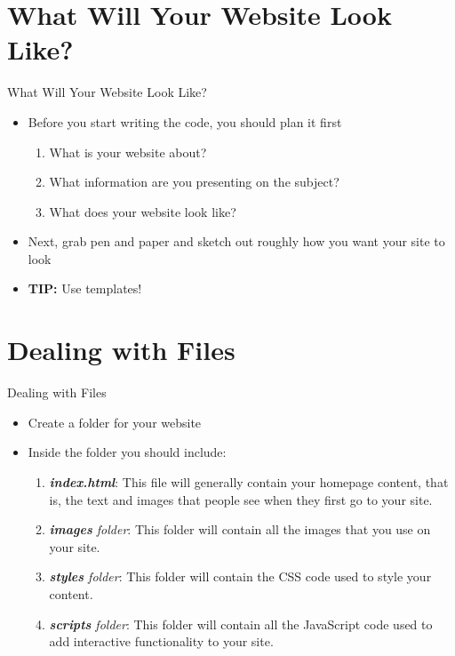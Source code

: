 \documentclass[aspectratio=169]{beamer}
\begin{document}
\begin{darkframes}
    \section{What Will Your Website Look Like?}
    \begin{frame}{What Will Your Website Look Like?}
        \begin{itemize}
            \item Before you start writing the code, you should plan it first
            \begin{enumerate}
                \item What is your website about?
                \item What information are you presenting on the subject?
                \item What does your website look like?
            \end{enumerate}
            \item Next, grab pen and paper and sketch out roughly how you want your site to look
            \item \textbf{TIP:} Use templates!
        \end{itemize}
    \end{frame}
    
    \section{Dealing with Files}
    \begin{frame}{Dealing with Files}
        \begin{itemize}
            \item Create a folder for your website
            \item Inside the folder you should include:
            \begin{enumerate}
                \item \textit{\textbf{index.html}}: This file will generally contain your homepage content, that is, the text and images that people see when they first go to your site.
                \item \textit{\textbf{images} folder}: This folder will contain all the images that you use on your site.
                \item \textit{\textbf{styles} folder}: This folder will contain the CSS code used to style your content.
                \item \textit{\textbf{scripts} folder}: This folder will contain all the JavaScript code used to add interactive functionality to your site.
            \end{enumerate}
        \end{itemize}
    \end{frame}


\end{darkframes}
\end{document}
